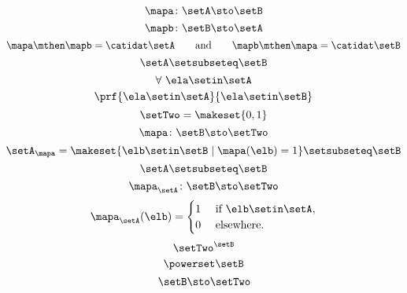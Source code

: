 {\begin{forslides}
    \begin{equation}
        \label{eq:slides_session2_183}
        \mapa\colon \setA \sto \setB
    \end{equation}
    \begin{equation}
        \label{eq:slides_session2_184}
        \mapb \colon \setB \sto \setA
    \end{equation}
    \begin{equation}
        \label{eq:slides_session2_185}
        \mapa \mthen \mapb = \catidat\setA \qquad \text{and}  \qquad \mapb \mthen \mapa = \catidat\setB
    \end{equation}
    \begin{equation}
        \label{eq:slides_session2_186}
        \setA \setsubseteq \setB
    \end{equation}
    \begin{equation}
        \label{eq:slides_session2_187}
        \forall \ \ela \setin\setA
    \end{equation}
    \begin{equation}
        \label{eq:slides_session2_188}
        \prf{
            \ela \setin\setA
        }{
            \ela \setin\setB
        }
    \end{equation}
    \begin{equation}
        \label{eq:slides_session2_189}
        \setTwo = \makeset{ 0, 1}
    \end{equation}
    \begin{equation}
        \label{eq:slides_session2_190}
        \mapa \colon \setB \sto \setTwo
    \end{equation}
    \begin{equation}
        \label{eq:slides_session2_191}
        \setA_\mapa = \makeset{ \elb \setin\setB \mid \mapa(\elb) = 1 } \setsubseteq \setB
    \end{equation}
    \begin{equation}
        \label{eq:slides_session2_192}
        \setA \setsubseteq \setB
    \end{equation}
    \begin{equation}
        \label{eq:slides_session2_193}
        \mapa_\setA \colon \setB \sto \setTwo
    \end{equation}
    \begin{equation}
        \label{eq:slides_session2_194}
        \mapa_\setA(\elb) = \begin{cases}
            1 & \text{ if }\elb\setin\setA, \\
            0 & \text{ elsewhere}.
        \end{cases}
    \end{equation}
    \begin{equation}
        \label{eq:slides_session2_195}
        \setTwo^\setB
    \end{equation}
    \begin{equation}
        \label{eq:slides_session2_196}
        \powerset \setB
    \end{equation}
    \begin{equation}
        \label{eq:slides_session2_197}
        \setB \sto \setTwo
    \end{equation}


\end{forslides}}

